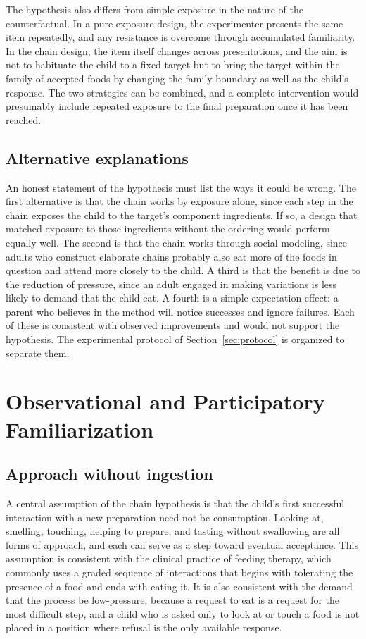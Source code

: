 \documentclass[11pt]{article}
\theoremstyle{remark}
\begin{document}
The hypothesis also differs from simple exposure in the nature of the counterfactual. In a pure exposure design, the experimenter presents the same item repeatedly, and any resistance is overcome through accumulated familiarity. In the chain design, the item itself changes across presentations, and the aim is not to habituate the child to a fixed target but to bring the target within the family of accepted foods by changing the family boundary as well as the child's response. The two strategies can be combined, and a complete intervention would presumably include repeated exposure to the final preparation once it has been reached.

\subsection{Alternative explanations}\label{sec:alt}

An honest statement of the hypothesis must list the ways it could be wrong. The first alternative is that the chain works by exposure alone, since each step in the chain exposes the child to the target's component ingredients. If so, a design that matched exposure to those ingredients without the ordering would perform equally well. The second is that the chain works through social modeling, since adults who construct elaborate chains probably also eat more of the foods in question and attend more closely to the child. A third is that the benefit is due to the reduction of pressure, since an adult engaged in making variations is less likely to demand that the child eat. A fourth is a simple expectation effect: a parent who believes in the method will notice successes and ignore failures. Each of these is consistent with observed improvements and would not support the hypothesis. The experimental protocol of Section~\ref{sec:protocol} is organized to separate them.

\section{Observational and Participatory Familiarization}\label{sec:approach}

\subsection{Approach without ingestion}

A central assumption of the chain hypothesis is that the child's first successful interaction with a new preparation need not be consumption. Looking at, smelling, touching, helping to prepare, and tasting without swallowing are all forms of approach, and each can serve as a step toward eventual acceptance. This assumption is consistent with the clinical practice of feeding therapy, which commonly uses a graded sequence of interactions that begins with tolerating the presence of a food and ends with eating it. It is also consistent with the demand that the process be low-pressure, because a request to eat is a request for the most difficult step, and a child who is asked only to look at or touch a food is not placed in a position where refusal is the only available response.
\end{document}
